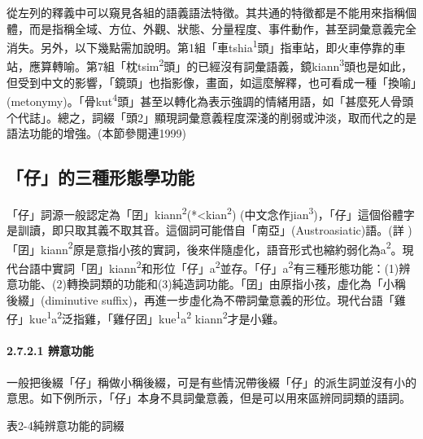 \textrm{從左列的釋義中可以窺見各組的語義語法特徵。其共通的特徵都是不能用來指稱個體，而是指稱全域、方位、外觀、狀態、分量程度、事件動作，甚至詞彙意義完全消失。另外，以下幾點需加說明。第1組「車tshia}\textrm{\textsuperscript{1}}\textrm{頭」指車站，即火車停靠的車站，應算轉喻。第7組「枕tsim}\textrm{\textsuperscript{2}}\textrm{頭」的已經沒有詞彙語義，鏡kiann}\textrm{\textsuperscript{3}}\textrm{頭也是如此，但受到中文的影響，「鏡頭」也指影像，畫面，如這麼解釋，也可看成一種「換喻」(metonymy)。「骨kut}\textrm{\textsuperscript{4}}\textrm{頭」甚至以轉化為表示強調的情緒用語，如「甚麼死人骨頭个代誌」。總之，詞綴「頭2」顯現詞彙意義程度深淺的削弱或沖淡，取而代之的是語法功能的增強。(本節參閱連1999)}

\subsection{\rmfamily 「仔」的三種形態學功能}

\textrm{「仔」詞源一般認定為「囝」kiann}\textrm{\textsuperscript{2}}\textrm{(*<kian}\textrm{\textsuperscript{2}}\textrm{) (中文念作jian}\textrm{\textsuperscript{3}}\textrm{)，「仔」這個俗體字是訓讀，即只取其義不取其音。這個詞可能借自「南亞」(Austroasiatic)語。(詳 \citealt{NormanMei1976})「囝」kiann}\textrm{\textsuperscript{2}}\textrm{原是意指小孩的實詞，後來伴隨虛化，語音形式也縮約弱化為a}\textrm{\textsuperscript{2}}。\textrm{現代台語中實詞「囝」kiann}\textrm{\textsuperscript{2}}\textrm{和形位「仔」a}\textrm{\textsuperscript{2}}\textrm{並存。「仔」a}\textrm{\textsuperscript{2}}\textrm{有三種形態功能}：\textrm{(1)辨意功能、(2)轉換詞類的功能和(3)純造詞功能。「囝」由原指小孩，虛化為「小稱後綴」(diminutive suffix)}，\textrm{再進一步虛化為不帶詞彙意義的形位。現代台語「雞仔」kue}\textrm{\textsuperscript{1}}\textrm{a}\textrm{\textsuperscript{2}}\textrm{泛指雞，「雞仔囝」kue}\textrm{\textsuperscript{1}}\textrm{a}\textrm{\textsuperscript{2}} \textrm{kiann}\textrm{\textsuperscript{2}}\textrm{才是小雞。}

\paragraph{2.7.2.1 辨意功能}

\textrm{一般把後綴「仔」稱做小稱後綴，可是有些情況帶後綴「仔」的派生詞並沒有小的意思。如下例所示，「仔」本身不具詞彙意義，但是可以用來區辨同詞類的語詞。}

\rmfamily
表2-4純辨意功能的詞綴

\tablefirsthead{}

